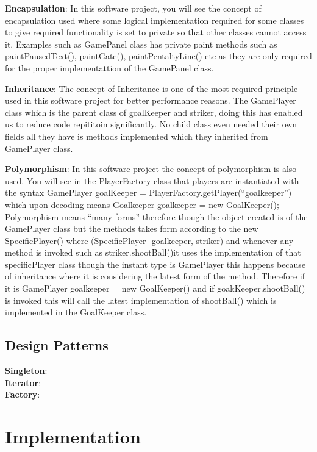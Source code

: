 \documentclass[12pt, dvipsnames, a4paper]{article}
\begin{document}
\textbf{Encapsulation}: In this software project, you will see the concept of encapsulation used where some logical implementation
required for some classes to give required functionality is set to private so that other classes cannot access it.
Examples such as GamePanel class has private paint methods such as paintPausedText(), paintGate(), paintPentaltyLine() etc
as they are only required for the proper implementattion of the GamePanel class.

\textbf{Inheritance}: The concept of Inheritance is one of the most required principle used in this software project for better performance reasons.
The GamePlayer class which is the parent class of goalKeeper and striker, doing this has enabled us to reduce code repititoin significantly.
No child class even needed their own fields all they have is methods implemented which they inherited from GamePlayer class.

\textbf{Polymorphism}: In this software project the concept of polymorphism is also used. You will see in the PlayerFactory class that
players are instantiated with the syntax GamePlayer goalKeeper = PlayerFactory.getPlayer(“goalkeeper”) which upon decoding means Goalkeeper goalkeeper = new GoalKeeper();
Polymorphism means “many forms” therefore though the object created is of the GamePlayer class but the methods takes form according to the
new SpecificPlayer() where (SpecificPlayer- goalkeeper, striker) and whenever any method is invoked such as striker.shootBall()it uses the implementation
of that specificPlayer class though the instant type is GamePlayer this happens because of inheritance where it is considering the latest form of the method.
Therefore if it is GamePlayer goalkeeper =  new GoalKeeper() and if goakKeeper.shootBall() is invoked this will call the
latest implementation of shootBall() which is implemented in the GoalKeeper class.

\subsection{Design Patterns}
\textbf{Singleton}: \\
\textbf{Iterator}: \\
\textbf{Factory}:
\clearpage

\section{Implementation}
\end{document}
